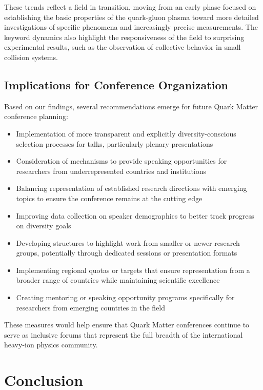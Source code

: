 \documentclass[a4paper,11pt]{article}
\begin{document}
These trends reflect a field in transition, moving from an early phase focused on establishing the basic properties of the quark-gluon plasma toward more detailed investigations of specific phenomena and increasingly precise measurements. The keyword dynamics also highlight the responsiveness of the field to surprising experimental results, such as the observation of collective behavior in small collision systems.

\subsection{Implications for Conference Organization}

Based on our findings, several recommendations emerge for future Quark Matter conference planning:

\begin{itemize}
    \item Implementation of more transparent and explicitly diversity-conscious selection processes for talks, particularly plenary presentations
    \item Consideration of mechanisms to provide speaking opportunities for researchers from underrepresented countries and institutions
    \item Balancing representation of established research directions with emerging topics to ensure the conference remains at the cutting edge
    \item Improving data collection on speaker demographics to better track progress on diversity goals
    \item Developing structures to highlight work from smaller or newer research groups, potentially through dedicated sessions or presentation formats
    \item Implementing regional quotas or targets that ensure representation from a broader range of countries while maintaining scientific excellence
    \item Creating mentoring or speaking opportunity programs specifically for researchers from emerging countries in the field
\end{itemize}

These measures would help ensure that Quark Matter conferences continue to serve as inclusive forums that represent the full breadth of the international heavy-ion physics community.

\section{Conclusion}
\end{document}
